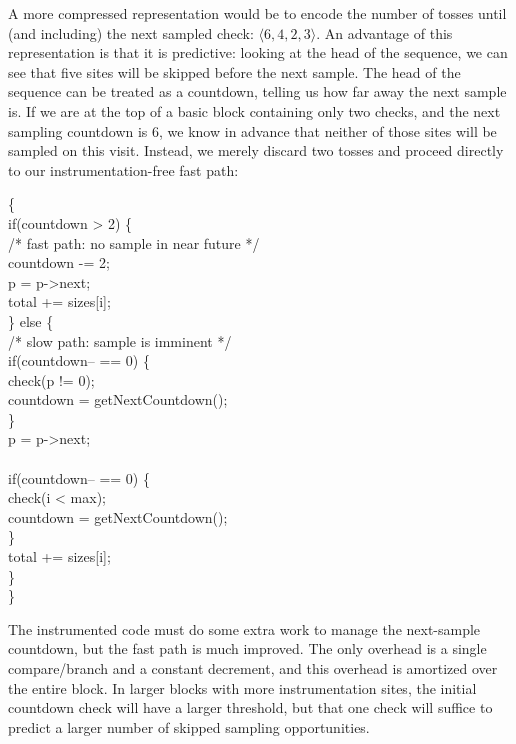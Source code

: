 A more compressed representation would be to encode the number of
tosses until (and including) the next sampled check: $\langle 6, 4, 2,
3 \rangle$.  An advantage of this representation is that it is
predictive: looking at the head of the sequence, we can see that five
sites will be skipped before the next sample.  The head of the
sequence can be treated as a countdown, telling us how far away the
next sample is.  If we are at the top of a basic block containing only
two checks, and the next sampling countdown is 6, we know in advance
that neither of those sites will be sampled on this visit.  Instead,
we merely discard two tosses and proceed directly to our
instrumentation-free fast path:

\begin{code}
  \{\+ \\
  if(countdown > 2) \{ \\
  \> /* fast path: no sample in near future */ \\
  \> countdown -= 2; \\
  \> \up p = p->next; \\
  \> \up total += sizes[i]; \\
  \} else \{ \\
  \> /* slow path: sample is imminent */ \\
  \> if(countdown-- == 0) \{ \\
  \>\> check(p != 0); \\
  \>\> countdown = getNextCountdown(); \\
  \> \} \\
  \> \up p = p->next; \\
  \> \\
  \> if(countdown-- == 0) \{ \\
  \>\> check(i < max); \\
  \>\> countdown = getNextCountdown(); \\
  \> \} \\
  \> \up total += sizes[i]; \\
  \} \\
  \<\}
\end{code}

The instrumented code must do some extra work to manage the
next-sample countdown, but the fast path is much improved.  The only
overhead is a single compare/branch and a constant decrement, and this
overhead is amortized over the entire block.  In larger blocks with
more instrumentation sites, the initial countdown check will have a
larger threshold, but that one check will suffice to predict a larger
number of skipped sampling opportunities.

